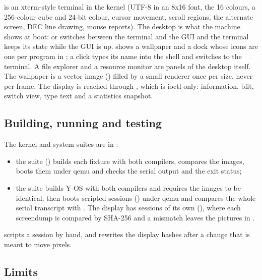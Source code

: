  is an xterm-style terminal in the kernel (UTF-8 in an 8x16 font,
the 16 colours, a 256-colour cube and 24-bit colour, cursor movement, scroll
regions, the alternate screen, DEC line drawing, mouse reports). The desktop
is what the machine shows at boot:  or  switches between the
terminal and the GUI and the terminal keeps its state while the GUI is up.
 shows a wallpaper and a dock whose icons are one per program in
; a click types its name into the shell and switches to the terminal.
A file explorer and a resource monitor are panels of the desktop itself. The
wallpaper is a vector image () filled by a small
renderer once per size, never per frame. The display is reached through
, which is ioctl-only: information, blit, switch view, type text
and a statistics snapshot.

\subsection{Building, running and testing}
\label{sec:os-cost}

The kernel and system suites are in :

\begin{itemize}[nosep]
\item the  suite () builds each fixture with both
  compilers, compares the images, boots them under qemu and checks the serial
  output and the exit status;
\item the  suite builds Y-OS with both compilers and requires the
  images to be identical, then boots scripted sessions
  () under qemu and compares the whole serial transcript
  with . The display has sessions of its own
  (), where each screendump is compared by
  SHA-256 and a mismatch leaves the pictures in .
\end{itemize}

\noindent {} scripts a session by hand, and
 rewrites the display hashes after a change that is
meant to move pixels.

\subsection{Limits}

